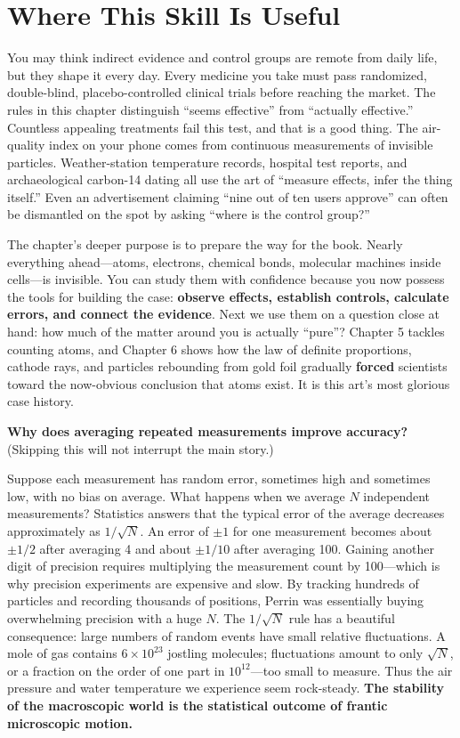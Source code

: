 \section{Where This Skill Is Useful}

You may think indirect evidence and control groups are remote from daily life, but they shape it every day. Every medicine you take must pass randomized, double-blind, placebo-controlled clinical trials before reaching the market. The rules in this chapter distinguish ``seems effective'' from ``actually effective.'' Countless appealing treatments fail this test, and that is a good thing. The air-quality index on your phone comes from continuous measurements of invisible particles. Weather-station temperature records, hospital test reports, and archaeological carbon-14 dating all use the art of ``measure effects, infer the thing itself.'' Even an advertisement claiming ``nine out of ten users approve'' can often be dismantled on the spot by asking ``where is the control group?''

The chapter's deeper purpose is to prepare the way for the book. Nearly everything ahead---atoms, electrons, chemical bonds, molecular machines inside cells---is invisible. You can study them with confidence because you now possess the tools for building the case: \textbf{observe effects, establish controls, calculate errors, and connect the evidence}. Next we use them on a question close at hand: how much of the matter around you is actually ``pure''? Chapter 5 tackles counting atoms, and Chapter 6 shows how the law of definite proportions, cathode rays, and particles rebounding from gold foil gradually \textbf{forced} scientists toward the now-obvious conclusion that atoms exist. It is this art's most glorious case history.

\begin{tiaozhan}
\textbf{Why does averaging repeated measurements improve accuracy?} (Skipping this will not interrupt the main story.)

Suppose each measurement has random error, sometimes high and sometimes low, with no bias on average. What happens when we average $N$ independent measurements? Statistics answers that the typical error of the average decreases approximately as $1/\sqrt{N}$. An error of $\pm 1$ for one measurement becomes about $\pm 1/2$ after averaging 4 and about $\pm 1/10$ after averaging 100. Gaining another digit of precision requires multiplying the measurement count by 100---which is why precision experiments are expensive and slow. By tracking hundreds of particles and recording thousands of positions, Perrin was essentially buying overwhelming precision with a huge $N$. The $1/\sqrt{N}$ rule has a beautiful consequence: large numbers of random events have small relative fluctuations. A mole of gas contains $6\times 10^{23}$ jostling molecules; fluctuations amount to only $\sqrt{N}$, or a fraction on the order of one part in $10^{12}$---too small to measure. Thus the air pressure and water temperature we experience seem rock-steady. \textbf{The stability of the macroscopic world is the statistical outcome of frantic microscopic motion.}
\end{tiaozhan}

